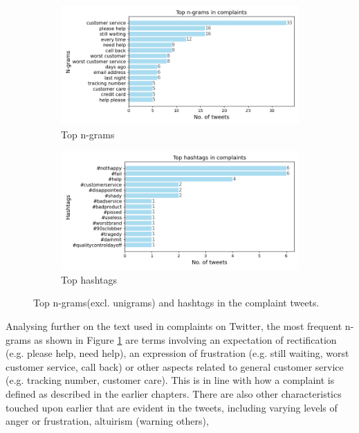 \begin{figure}[htbp]
    \centering
    \captionsetup{font=small}
    \begin{subfigure}{0.49\textwidth}
        \centering
        \includegraphics[width=\linewidth]{figures/top_ngram_horiz_bar.png}
        \caption{Top n-grams}
        \label{fig: top_ngrams}
    \end{subfigure}
    \hfill
    \begin{subfigure}{0.49\textwidth}
        \centering
        \includegraphics[width=\linewidth]{figures/top_hash_horiz_bar.png}
        \caption{Top hashtags}
        \label{fig: top_hashtags}
    \end{subfigure}
    \caption{Top n-grams(excl. unigrams) and hashtags in the complaint tweets.}
    \label{fig: top_ngrams_hashtags}
\end{figure}

Analysing further on the text used in complaints on Twitter, the most frequent n-grams as shown in Figure \ref{fig: top_ngrams} are terms involving an expectation of rectification (e.g. please help, need help), an expression of frustration (e.g. still waiting, worst customer service, call back) or other aspects related to general customer service (e.g. tracking number, customer care). This is in line with how a complaint is defined as described in the earlier chapters. There are also other characteristics touched upon earlier that are evident in the tweets, including varying levels of anger or frustration, altuirism (warning others),  \\

